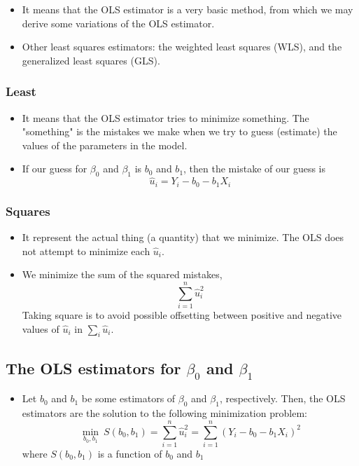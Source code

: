 \documentclass[11pt]{article}
\begin{document}
\begin{itemize}
\item It means that the OLS estimator is a very basic method,
from which we may derive some variations of the OLS
estimator.

\item Other least squares estimators: the weighted least squares (WLS),
and the generalized least squares (GLS).
\end{itemize}

\subsubsection*{Least}
\label{sec:orga472708}

\begin{itemize}
\item It means that the OLS estimator tries to minimize something. The
"something" is the mistakes we make when we try to guess
(estimate) the values of the parameters in the model.

\item If our guess for \(\beta_0\) and \(\beta_1\) is \(b_0\) and \(b_1\), then
the mistake of our guess is 
$$\hat{u}_{i} = Y_{i} - b_0 - b_1 X_i$$
\end{itemize}

\subsubsection*{Squares}
\label{sec:orge85c395}

\begin{itemize}
\item It represent the actual thing (a quantity) that we minimize. The
OLS does not attempt to minimize each \(\hat{u}_{i}\).

\item We minimize the sum of the squared mistakes, 
$$\sum_{i=1}^n \hat{u}_i^2$$
Taking square is to avoid possible offsetting
between positive and negative values of \(\hat{u}_i\) in \(\sum_i
    \hat{u}_i\).
\end{itemize}


\subsection*{The OLS estimators for \(\beta_0\) and \(\beta_1\)}
\label{sec:orge670153}

\begin{itemize}
\item Let \(b_0\) and \(b_1\) be some estimators of \(\beta_0\) and \(\beta_1\),
respectively. Then, the OLS estimators are the solution to the
following minimization problem:
\begin{equation}
\operatorname*{min}_{b_0, b_1}\: S(b_0, b_1) = \sum_{i=1}^n \hat{u}_i^2 = \sum_{i=1}^n (Y_i - b_0 - b_1 X_i)^2 \label{eq:min-ols}
\end{equation}
where \(S(b_0, b_1)\) is a function of \(b_0\) and \(b_1\)
\end{itemize}
\end{document}
